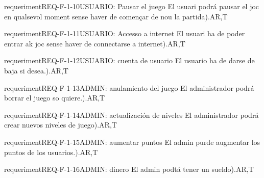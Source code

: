 



requeriment{REQ-F-1-10}{USUARIO: Pausar el juego}{
El usuari podrá pausar el joc en qualsevol moment sense haver de començar de nou la partida).}{A}{R,T}

requeriment{REQ-F-1-11}{USUARIO: Accesso a internet}{
El usuari ha de poder entrar ak joc sense haver de connectarse a internet).}{A}{R,T}

requeriment{REQ-F-1-12}{USUARIO: cuenta de usuario}{
El usuario ha de darse de baja si desea.).}{A}{R,T}

requeriment{REQ-F-1-13}{ADMIN: anulamiento del juego}{
El administrador podrá borrar el juego so quiere.).}{A}{R,T}

requeriment{REQ-F-1-14}{ADMIN: actualización de niveles}{
El administrador podrá crear nuevos niveles de juego).}{A}{R,T}


requeriment{REQ-F-1-15}{ADMIN: aumentar puntos}{
El admin purde augmentar los puntos de los usuarios.).}{A}{R,T}

requeriment{REQ-F-1-16}{ADMIN: dinero }{
El admin podtá tener un sueldo).}{A}{R,T}